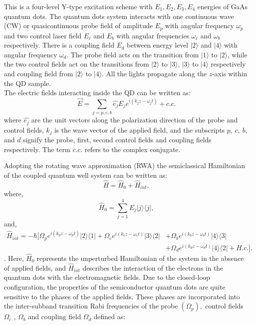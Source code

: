 \documentclass[12pt,a4paper]{article}
\begin{document}
This is a four-level Y-type excitation scheme with \(E_1,E_2,E_3,E_4\) energies of GaAs quantum dots. The quantum dots system interacts with one continuous wave (CW) or quasicontinuous probe field of amplitude \(E_p\) with angular frequency \(\omega_p\) and two control laser field \(E_c\) and \(E_b\) with angular frequencies \(\omega_c\) and \(\omega_b\) respectively. There is a coupling field \(E_d\) between energy level \(|2\rangle\) and \(|4\rangle\) with angular frequency \(\omega_d\). The probe field acts on the transition from \(|1\rangle\) to \(|2\rangle\), while the two control fields act on the transitions from \(|2\rangle\) to \(|3\rangle\), \(|3\rangle\) to \(|4\rangle\) respectively and coupling field from \(|2\rangle\) to \(|4\rangle\). All the lights propagate along the \(z\)-axis within the QD sample.\\
 The electric fields interacting inside the QD can be written as:
 \begin{equation}
     \vec{E}=\sum_{j=p,c,b}\hat{e_j}E_je^{i(k_jz-\omega_jt)}+c.c.
 \end{equation}
where \(\hat{e_j}\) are the unit vectors along the polarization direction of the probe and control fields, \(k_j\) is the wave vector of the applied field, and the subscripts \(p,\ c,\ b,\) and \(d\) signify the probe, first, second control fields and coupling fields respectively. The term \(c.c.\) refers to the complex conjugate.\par
Adopting the rotating wave approximation (RWA) the semiclassical Hamiltonian of the coupled quantum well system can be written as:
\begin{equation}
    \hat{H}=\hat{H}_0+\hat{H}_{int},
\end{equation}
where,
\begin{equation}
    \hat{H}_0=\sum_{j=1}^4E_j|j\rangle\langle j|,
\end{equation}
and,
\begin{align}
    \hat{H}_{int} = -\hbar[\Omega_pe^{i(k_pz-\omega_pt)}|2\rangle\langle 1|+\Omega_ce^{i(k_cz-\omega_ct)}|3\rangle\langle 2|&+\Omega_be^{i(k_bz-\omega_bt)}|4\rangle\langle 3|\nonumber\\&+\Omega_de^{i(k_dz-\omega_dt)}|4\rangle\langle 2|+H.c.].
\end{align}.
Here, \(\hat{H}_0\) represents the unperturbed Hamiltonian of the system in the absence of applied fields, and \(\hat{H}_{int}\) describes the interaction of the electrons in the quantum dots with the electromagnetic fields. Due to the closed-loop configuration, the properties of the semiconductor quantum dots are quite sensitive to the phases of the applied fields. These phases are incorporated into the inter-subband transition Rabi frequencies of the probe \((\Omega_p),\) control fields \(\Omega_c\) , \(\Omega_b\) and coupling field \(\Omega_d\) defined as:
\end{document}
